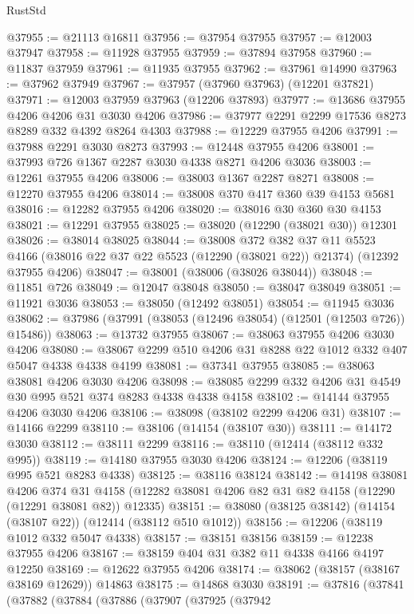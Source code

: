 \begin{lexlean}{RustStd}
\begin{coremodule}
@37955 := @21113 @16811
@37956 := @37954 @37955
@37957 := @12003 @37947
@37958 := @11928 @37955
@37959 := @37894 @37958
@37960 := @11837 @37959
@37961 := @11935 @37955
@37962 := @37961 @14990
@37963 := @37962 @37949
@37967 := @37957 (@37960 @37963) (@12201 @37821)
@37971 := @12003 @37959 @37963 (@12206 @37893)
@37977 := @13686 @37955 @4206 @4206 @31 @3030 @4206
@37986 := @37977 @2291 @2299 @17536 @8273 @8289 @332 @4392 @8264 @4303
@37988 := @12229 @37955 @4206
@37991 := @37988 @2291 @3030 @8273
@37993 := @12448 @37955 @4206
@38001 := @37993 @726 @1367 @2287 @3030 @4338 @8271 @4206 @3036
@38003 := @12261 @37955 @4206
@38006 := @38003 @1367 @2287 @8271
@38008 := @12270 @37955 @4206
@38014 := @38008 @370 @417 @360 @39 @4153 @5681
@38016 := @12282 @37955 @4206
@38020 := @38016 @30 @360 @30 @4153
@38021 := @12291 @37955
@38025 := @38020 (@12290 (@38021 @30)) @12301
@38026 := @38014 @38025
@38044 := @38008
    @372
    @382
    @37
    @11
    @5523
    @4166
    (@38016 @22 @37 @22 @5523 (@12290 (@38021 @22)) @21374)
    (@12392 @37955 @4206)
@38047 := @38001 (@38006 (@38026 @38044))
@38048 := @11851 @726
@38049 := @12047 @38048
@38050 := @38047 @38049
@38051 := @11921 @3036
@38053 := @38050 (@12492 @38051)
@38054 := @11945 @3036
@38062 := @37986 (@37991 (@38053 (@12496 @38054) (@12501 (@12503 @726)) @15486))
@38063 := @13732 @37955
@38067 := @38063 @37955 @4206 @3030 @4206
@38080 := @38067 @2299 @510 @4206 @31 @8288 @22 @1012 @332 @407 @5047 @4338 @4338 @4199
@38081 := @37341 @37955
@38085 := @38063 @38081 @4206 @3030 @4206
@38098 := @38085 @2299 @332 @4206 @31 @4549 @30 @995 @521 @374 @8283 @4338 @4338 @4158
@38102 := @14144 @37955 @4206 @3030 @4206
@38106 := @38098 (@38102 @2299 @4206 @31)
@38107 := @14166 @2299
@38110 := @38106 (@14154 (@38107 @30))
@38111 := @14172 @3030
@38112 := @38111 @2299
@38116 := @38110 (@12414 (@38112 @332 @995))
@38119 := @14180 @37955 @3030 @4206
@38124 := @12206 (@38119 @995 @521 @8283 @4338)
@38125 := @38116 @38124
@38142 := @14198
    @38081
    @4206
    @374
    @31
    @4158
    (@12282 @38081 @4206 @82 @31 @82 @4158 (@12290 (@12291 @38081 @82)) @12335)
@38151 := @38080 (@38125 @38142) (@14154 (@38107 @22)) (@12414 (@38112 @510 @1012))
@38156 := @12206 (@38119 @1012 @332 @5047 @4338)
@38157 := @38151 @38156
@38159 := @12238 @37955 @4206
@38167 := @38159 @404 @31 @382 @11 @4338 @4166 @4197 @12250
@38169 := @12622 @37955 @4206
@38174 := @38062 (@38157 (@38167 @38169 @12629)) @14863
@38175 := @14868 @3030
@38191 := @37816
    (@37841
      (@37882
        (@37884
          (@37886
            (@37907
              (@37925
                (@37942

\end{coremodule}
\end{lexlean}
